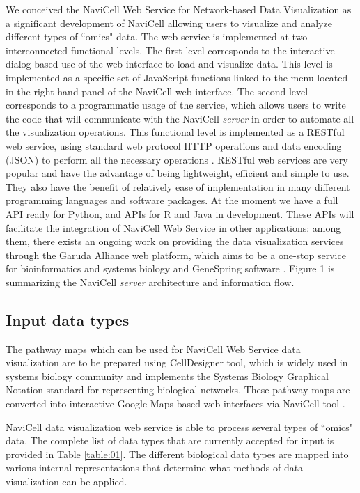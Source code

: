 \documentclass[a4,center,fleqn]{NAR}
\begin{document}
We conceived the NaviCell Web Service for Network-based Data Visualization
as a significant development of NaviCell \cite{kuperstein2013navicell} 
allowing users to visualize and analyze different types of ``omics" data. The web service
is implemented at two interconnected functional levels.
The first level corresponds to the interactive dialog-based
use of the web interface to load and visualize data. This level is implemented
as a specific set of JavaScript functions linked to the menu located
in the right-hand panel of the NaviCell web interface. The second level corresponds to a
programmatic usage of the service, which allows users to write the code that will
communicate with the NaviCell \emph{server} in order to automate all the
visualization operations. This functional level is implemented as a RESTful web
service, using standard web protocol HTTP operations and data encoding (JSON)
to perform all the necessary operations \cite{fielding2002principled}.
RESTful web services are very popular and have the advantage of being
lightweight, efficient and simple to use. They also have the benefit of
relatively ease of implementation in many different programming languages and
software packages. At the moment we have a full API ready for Python, and
APIs for R and Java in development. These APIs will facilitate the integration
of NaviCell Web Service in other applications: among them, there exists an
ongoing work on providing the data visualization services through the Garuda
Alliance web platform, which aims to be a one-stop service for bioinformatics
and systems biology \cite{ghosh2011software} and GeneSpring software
\cite{Chu2001}. Figure 1 is summarizing the NaviCell \emph{server} architecture
and information flow.

\subsection{Input data types}

The pathway maps which can be used for NaviCell Web Service data visualization
are to be prepared using CellDesigner tool\cite{Funahashi2008}, which is widely used in systems biology
community and implements the Systems Biology Graphical Notation standard \cite{LeNovere2009}
for representing biological networks. These pathway maps are converted into
interactive Google Maps-based web-interfaces via NaviCell tool \cite{kuperstein2013navicell}.

NaviCell data visualization web service is able to process
several types of ``omics" data. The complete list of data types that are
currently accepted for input is provided in Table \ref{table:01}. The different biological data
types are mapped into various internal representations that determine what methods
of data visualization can be applied.
\end{document}
